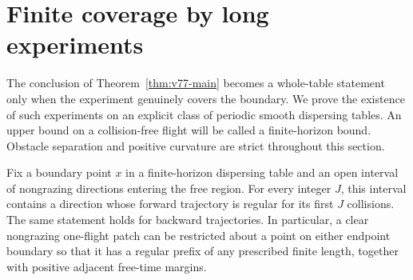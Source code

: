 \section{Finite coverage by long experiments}
\label{sec:v77-coverage}

The conclusion of Theorem~\ref{thm:v77-main} becomes a whole-table
statement only when the experiment genuinely covers the boundary.
We prove the existence of such experiments on an explicit class of
periodic smooth dispersing tables.  An upper bound on a collision-free
flight will be called a finite-horizon bound.  Obstacle separation and
positive curvature are strict throughout this section.

\begin{lemma}\label{lem:v77-fan}
Fix a boundary point $x$ in a finite-horizon dispersing table and an
open interval of nongrazing directions entering the free region.
For every integer $J$, this interval contains a direction whose forward
trajectory is regular for its first $J$ collisions.  The same statement
holds for backward trajectories.  In particular, a clear nongrazing
one-flight patch can be restricted about a point on either endpoint
boundary so that it has a regular prefix of any prescribed finite
length, together with positive adjacent free-time margins.
\end{lemma}
